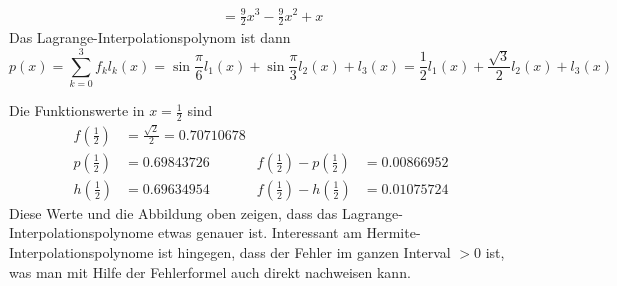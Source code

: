 \begin{loesung}
\begin{teilaufgaben}
\begin{align*}
&&=\frac92x^3-\frac92x^2+x
\end{align*}
Das Lagrange-Interpolationspolynom ist dann
\[
p(x)
=
\sum_{k=0}^3f_k l_k(x)
=
\sin\frac{\pi}6 l_1(x)
+
\sin\frac{\pi}3 l_2(x)
+
l_3(x)
=
\frac12l_1(x)
+
\frac{\sqrt{3}}2 l_2(x)
+
l_3(x)
\]
\item
Die Funktionswerte in $x=\frac12$ sind
\begin{align*}
f({\textstyle\frac12}) &= \frac{\sqrt{2}}2 = 0.70710678
\\
p({\textstyle\frac12}) &= 0.69843726
&
f({\textstyle\frac12}) - p({\textstyle\frac12}) 
&=
0.00866952
\\
h({\textstyle\frac12}) &= 0.69634954
&
f({\textstyle\frac12}) - h({\textstyle\frac12}) 
&=
0.01075724
\end{align*}
Diese Werte und die Abbildung oben zeigen, dass das
Lagrange-Interpolationspolynome etwas genauer ist.
Interessant am Hermite-Interpolationspolynome ist hingegen, dass
der Fehler im ganzen Interval $>0$ ist, was man mit Hilfe der
Fehlerformel auch direkt nachweisen kann.
\qedhere
\end{teilaufgaben}
\end{loesung}


